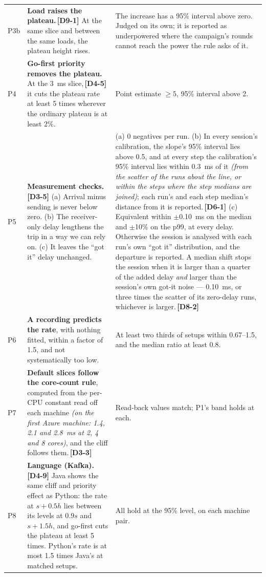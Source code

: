\documentclass[11pt]{article}
\newcommand{\gl}[1]{{\color{soft}\itshape\small (#1)}}
\newcommand{\chg}[1]{\,{\color{chgcol}\bfseries\footnotesize[#1]}}
\newcommand{\chgold}[1]{\,{\color{oldcol}\bfseries\footnotesize[#1]}}
\begin{document}
{\begin{longtable}{@{}p{1.0cm} p{9.5cm} p{5.6cm}@{}}
P3b & \textbf{Load raises the plateau.}\chg{D9-1} At the same slice and between the same loads, the plateau height rises. & The increase has a 95\% interval above zero. Judged on its own; it is reported as underpowered where the campaign's rounds cannot reach the power the rule asks of it. \\
P4 & \textbf{Go-first priority removes the plateau.} At the 3~ms slice,\chgold{D4-5} it cuts the plateau rate at least 5 times wherever the ordinary plateau is at least 2\%. & Point estimate $\ge 5$, 95\% interval above 2. \\
P5 & \textbf{Measurement checks.}\chgold{D3-5} (a) Arrival minus sending is never below zero. (b) The receiver-only delay lengthens the trip in a way we can rely on. (c) It leaves the ``got it'' delay unchanged. & (a) 0 negatives per run. (b) In every session's calibration, the slope's 95\% interval lies above 0.5, and at every step the calibration's 95\% interval lies within 0.3~ms of it \gl{from the scatter of the runs about the line, or within the steps where the step medians are joined}; each run's and each step median's distance from it is reported.\chgold{D6-1} (c) Equivalent within $\pm$0.10~ms on the median and $\pm$10\% on the p99, at every delay. Otherwise the session is analysed with each run's own ``got it'' distribution, and the departure is reported. A median shift stops the session when it is larger than a quarter of the added delay \emph{and} larger than the session's own got-it noise --- 0.10~ms, or three times the scatter of its zero-delay runs, whichever is larger.\chg{D8-2} \\
P6 & \textbf{A recording predicts the rate}, with nothing fitted, within a factor of 1.5, and not systematically too low. & At least two thirds of setups within 0.67--1.5, and the median ratio at least 0.8. \\
P7 & \textbf{Default slices follow the core-count rule}, computed from the per-CPU constant read off each machine \gl{on the first Azure machine: 1.4, 2.1 and 2.8~ms at 2, 4 and 8 cores}, and the cliff follows them.\chgold{D3-3} & Read-back values match; P1's band holds at each. \\
P8 & \textbf{Language (Kafka).}\chgold{D4-9} Java shows the same cliff and priority effect as Python: the rate at $s + 0.5h$ lies between its levels at $0.9s$ and $s + 1.5h$, and go-first cuts the plateau at least 5 times. Python's rate is at most 1.5 times Java's at matched setups. & All hold at the 95\% level, on each machine pair. \\

\end{longtable}}
\end{document}
